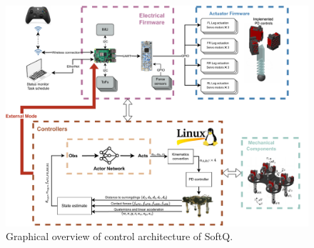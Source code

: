 \begin{figure}[htb]
    \centering
    \includegraphics[width=\linewidth]{img/chap4/control.pdf}
    \caption{Graphical overview of control architecture of SoftQ.}
    \label{fig:control}
\end{figure}